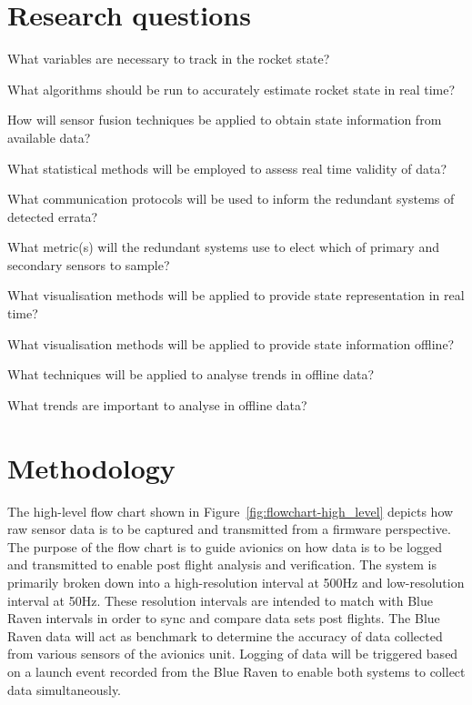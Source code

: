 \section{Research questions}
\begin{questions}
  \item What variables are necessary to track in the rocket state?
  \item What algorithms should be run to accurately estimate rocket state in real time?
  \item How will sensor fusion techniques be applied to obtain state information from available data?
  \item What statistical methods will be employed to assess real time validity of data? \begin{questions}
    \item What communication protocols will be used to inform the redundant systems of detected errata?
    \item What metric(s) will the redundant systems use to elect which of primary and secondary sensors to sample?
  \end{questions}
  \item What visualisation methods will be applied to provide state representation in real time?
  \item What visualisation methods will be applied to provide state information offline? \begin{questions}
    \item What techniques will be applied to analyse trends in offline data? 
    \item What trends are important to analyse in offline data?
  \end{questions}
\end{questions}

\section{Methodology}
The high-level flow chart shown in Figure~\ref{fig:flowchart-high_level} depicts how raw sensor data is to be captured and transmitted from a firmware perspective.  The purpose of the flow chart is to guide avionics on how data is to be logged and transmitted to enable post flight analysis and verification. The system is primarily broken down into a high-resolution interval at 500Hz and low-resolution interval at 50Hz. These resolution intervals are intended to match with Blue Raven intervals in order to sync and compare data sets post flights. The Blue Raven data will act as benchmark to determine the accuracy of data collected from various sensors of the avionics unit. Logging of data will be triggered based on a launch event recorded from the Blue Raven to enable both systems to collect data simultaneously. 

